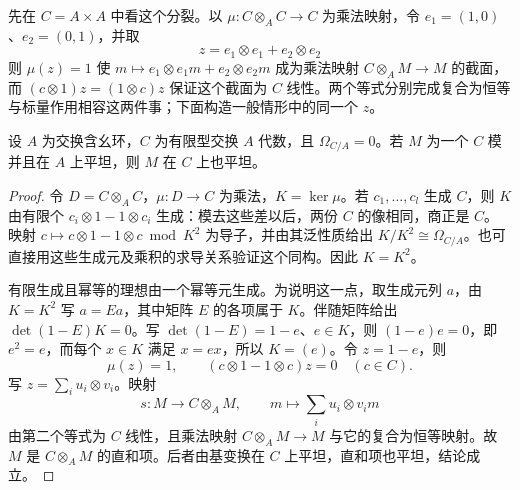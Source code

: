 \ProseParagraphBreak
先在 \(C=A\times A\) 中看这个分裂。以 \(\mu:C\otimes_AC\to C\) 为乘法映射，令 \(e_1=(1,0)\)、\(e_2=(0,1)\)，并取
\[
	z=e_1\otimes e_1+e_2\otimes e_2
\]
则 \(\mu(z)=1\) 使 \(m\mapsto e_1\otimes e_1m+e_2\otimes e_2m\) 成为乘法映射 \(C\otimes_AM\to M\) 的截面，而 \((c\otimes1)z=(1\otimes c)z\) 保证这个截面为 \(C\) 线性。两个等式分别完成复合为恒等与标量作用相容这两件事；下面构造一般情形中的同一个 \(z\)。

\begin{lemma}\label{b3:lem:unramified-diagonal-splitting}
	设 \(A\) 为交换含幺环，\(C\) 为有限型交换 \(A\) 代数，且 \(\Omega_{C/A}=0\)。若 \(M\) 为一个 \(C\) 模并且在 \(A\) 上平坦，则 \(M\) 在 \(C\) 上也平坦。
\end{lemma}
\begin{proof}
	令 \(D=C\otimes_AC\)，\(\mu:D\to C\) 为乘法，\(K=\ker\mu\)。若 \(c_1,\ldots,c_l\) 生成 \(C\)，则 \(K\) 由有限个 \(c_i\otimes1-1\otimes c_i\) 生成：模去这些差以后，两份 \(C\) 的像相同，商正是 \(C\)。映射 \(c\mapsto c\otimes1-1\otimes c\bmod K^2\) 为导子，并由其泛性质给出 \(K/K^2\cong\Omega_{C/A}\)。也可直接用这些生成元及乘积的求导关系验证这个同构。因此 \(K=K^2\)。

	有限生成且幂等的理想由一个幂等元生成。为说明这一点，取生成元列 \(a\)，由 \(K=K^2\) 写 \(a=Ea\)，其中矩阵 \(E\) 的各项属于 \(K\)。伴随矩阵给出 \(\det(1-E)K=0\)。写 \(\det(1-E)=1-e\)、\(e\in K\)，则 \((1-e)e=0\)，即 \(e^2=e\)，而每个 \(x\in K\) 满足 \(x=ex\)，所以 \(K=(e)\)。令 \(z=1-e\)，则
	\[
		\mu(z)=1,\qquad(c\otimes1-1\otimes c)z=0\quad(c\in C).
	\]
	写 \(z=\sum_i u_i\otimes v_i\)。映射
	\[
		s:M\longrightarrow C\otimes_AM, \qquad m\longmapsto\sum_i u_i\otimes v_i m
	\]
	由第二个等式为 \(C\) 线性，且乘法映射 \(C\otimes_AM\to M\) 与它的复合为恒等映射。故 \(M\) 是 \(C\otimes_AM\) 的直和项。后者由基变换在 \(C\) 上平坦，直和项也平坦，结论成立。
\end{proof}

